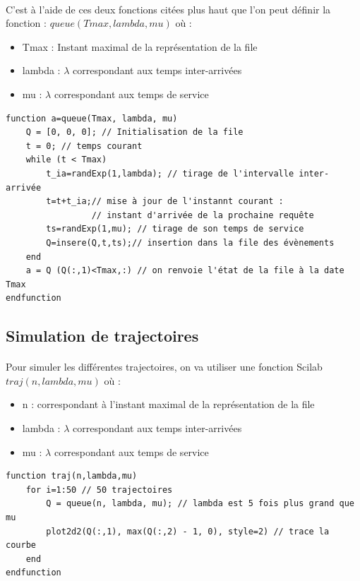 \documentclass{article}
\begin{document}
\paragraph{}
C'est à l'aide de ces deux fonctions citées plus haut que l'on peut définir la fonction : $queue(Tmax, lambda, mu)$ où :
\begin{itemize}
\item Tmax : Instant maximal de la représentation de la file
\item lambda : $\lambda$ correspondant aux temps inter-arrivées
\item mu :  $\lambda$ correspondant aux temps de service
\end{itemize}
\begin{verbatim}
function a=queue(Tmax, lambda, mu)
    Q = [0, 0, 0]; // Initialisation de la file
    t = 0; // temps courant
    while (t < Tmax)
        t_ia=randExp(1,lambda); // tirage de l'intervalle inter-arrivée
        t=t+t_ia;// mise à jour de l'instannt courant : 
                 // instant d'arrivée de la prochaine requête
        ts=randExp(1,mu); // tirage de son temps de service
        Q=insere(Q,t,ts);// insertion dans la file des évènements
    end
    a = Q (Q(:,1)<Tmax,:) // on renvoie l'état de la file à la date Tmax
endfunction
\end{verbatim}

\subsection{Simulation de trajectoires}
\paragraph{}
Pour simuler les différentes trajectoires, on va utiliser une fonction Scilab $traj(n,lambda,mu)$ où :
\begin{itemize}
\item n : correspondant à l'instant maximal de la représentation de la file
\item lambda : $\lambda$ correspondant aux temps inter-arrivées
\item mu :  $\lambda$ correspondant aux temps de service
\end{itemize}
\begin{verbatim}
function traj(n,lambda,mu)
    for i=1:50 // 50 trajectoires
        Q = queue(n, lambda, mu); // lambda est 5 fois plus grand que mu
        plot2d2(Q(:,1), max(Q(:,2) - 1, 0), style=2) // trace la courbe
    end
endfunction
\end{verbatim}
\end{document}
